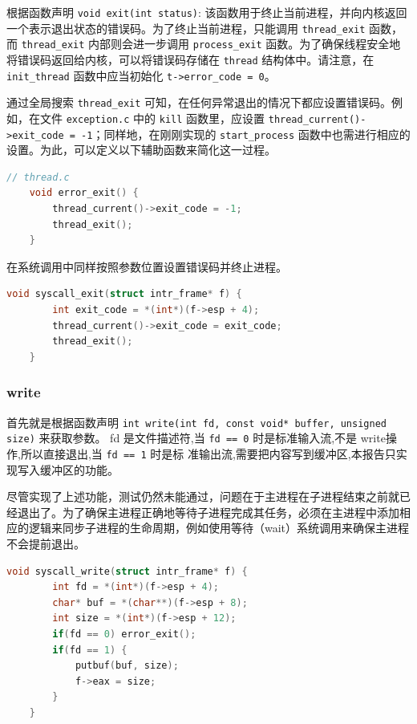 \documentclass{article}
\begin{document}
根据函数声明 \texttt{void exit(int status)}: 该函数用于终止当前进程，并向内核返回一个表示退出状态的错误码。为了终止当前进程，只能调用 \texttt{thread\_exit} 函数，而 \texttt{thread\_exit} 内部则会进一步调用 \texttt{process\_exit} 函数。为了确保线程安全地将错误码返回给内核，可以将错误码存储在 \texttt{thread} 结构体中。请注意，在 \texttt{init\_thread} 函数中应当初始化 \texttt{t->error\_code = 0}。

通过全局搜索 \texttt{thread\_exit} 可知，在任何异常退出的情况下都应设置错误码。例如，在文件 \texttt{exception.c} 中的 \texttt{kill} 函数里，应设置 \texttt{thread\_current()->exit\_code = -1}；同样地，在刚刚实现的 \texttt{start\_process} 函数中也需进行相应的设置。为此，可以定义以下辅助函数来简化这一过程。

\begin{lstlisting}[language=C]
	// thread.c 
	void error_exit() { 
		thread_current()->exit_code = -1; 
		thread_exit(); 
	}
\end{lstlisting}

在系统调用中同样按照参数位置设置错误码并终止进程。

\begin{lstlisting}[language=C]
	void syscall_exit(struct intr_frame* f) { 
		int exit_code = *(int*)(f->esp + 4); 
		thread_current()->exit_code = exit_code; 
		thread_exit(); 
	}
\end{lstlisting}

\subsubsection{write}
首先就是根据函数声明 \texttt{int write(int fd, const void* buffer, unsigned size)} 来获取参数。
fd 是文件描述符,当 \texttt{fd == 0} 时是标准输入流,不是 write操作,所以直接退出,当 \texttt{fd == 1} 时是标 准输出流,需要把内容写到缓冲区,本报告只实现写入缓冲区的功能。

尽管实现了上述功能，测试仍然未能通过，问题在于主进程在子进程结束之前就已经退出了。为了确保主进程正确地等待子进程完成其任务，必须在主进程中添加相应的逻辑来同步子进程的生命周期，例如使用等待（wait）系统调用来确保主进程不会提前退出。

\begin{lstlisting}[language=C]
	void syscall_write(struct intr_frame* f) { 
		int fd = *(int*)(f->esp + 4); 
		char* buf = *(char**)(f->esp + 8); 
		int size = *(int*)(f->esp + 12);
		if(fd == 0) error_exit();
		if(fd == 1) { 
			putbuf(buf, size); 
			f->eax = size; 
		} 
	}
\end{lstlisting}
\end{document}

